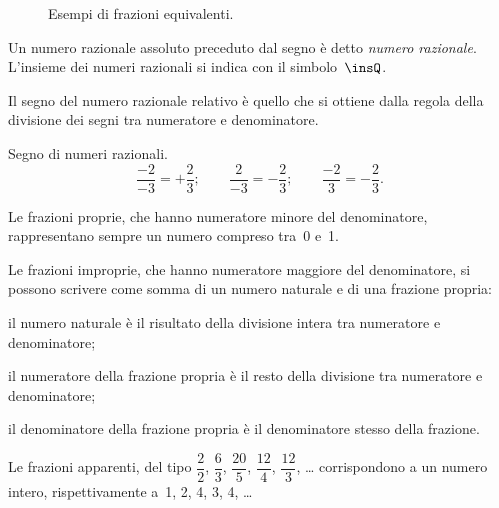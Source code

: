 \begin{figure}[t]
\centering 
\caption{Esempi di frazioni equivalenti.}\label{fig:frazequiv}
\end{figure}

\begin{definizione}
Un numero razionale assoluto preceduto dal segno è detto \emph{numero razionale}.
L'insieme dei numeri razionali si indica con il simbolo~$\insQ$.
\end{definizione}

Il segno del numero razionale relativo è quello che si ottiene dalla regola della
divisione dei segni tra numeratore e denominatore.

\begin{exrig}
\begin{esempio}
Segno di numeri razionali.
\[\frac{-2}{-3}=+\frac{2}{3};\qquad\frac{2}{-3}=-\frac{2}{3};\qquad\frac{-2}{3}=-\frac{2}{3}.\]
\end{esempio}
\end{exrig}

Le frazioni proprie, che hanno numeratore minore del denominatore, rappresentano sempre un numero compreso tra~0 e~1.

\pagebreak

Le frazioni improprie, che hanno numeratore maggiore del denominatore, si possono scrivere come somma di un numero
naturale e di una frazione propria:
\begin{itemize*}
 \item il numero naturale è il risultato della divisione intera tra numeratore e denominatore;
 \item il numeratore della frazione propria è il resto della divisione tra numeratore e denominatore;
 \item il denominatore della frazione propria è il denominatore stesso della frazione.
\end{itemize*}

Le frazioni apparenti, del tipo
$\dfrac{2}{2}$, $\dfrac{6}{3}$, $\dfrac{20}{5}$, $\dfrac{12}{4}$, $\dfrac{12}{3}$, \ldots{}
corrispondono a un numero intero, rispettivamente a~1, 2, 4, 3, 4, \ldots{}

